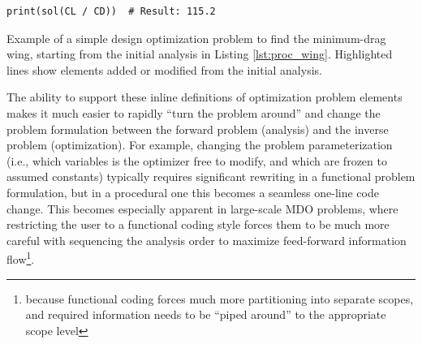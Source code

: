 \begin{enumerate}
\begin{listing}[H]
\begin{verbatim}
print(sol(CL / CD))  # Result: 115.2
        \end{verbatim}
        \caption{Example of a simple design optimization problem to find the minimum-drag wing, starting from the initial analysis in Listing \ref{lst:proc_wing}. Highlighted lines show elements added or modified from the initial analysis.}
        \label{lst:proc_wing_opt}
    \end{listing}

    The ability to support these inline definitions of optimization problem elements makes it much easier to rapidly ``turn the problem around'' and change the problem formulation between the forward problem (analysis) and the inverse problem (optimization). For example, changing the problem parameterization (i.e., which variables is the optimizer free to modify, and which are frozen to assumed constants) typically requires significant rewriting in a functional problem formulation, but in a procedural one this becomes a seamless one-line code change. This becomes especially apparent in large-scale MDO problems, where restricting the user to a functional coding style forces them to be much more careful with sequencing the analysis order to maximize feed-forward information flow\footnote{because functional coding forces much more partitioning into separate scopes, and required information needs to be ``piped around'' to the appropriate scope level}.

\end{enumerate}

